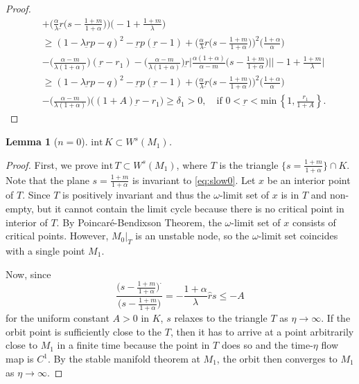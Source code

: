 \documentclass[a4paper,11pt]{article}
\newtheorem{lemma}{Lemma}[section]
\begin{document}
\begin{proof}
\begin{align}
  &+ \Big(\frac{\alpha}{\lambda}\underbar{r}\big(s- \frac{1+m}{1+\alpha}\big)\Big)\Big(-1+ \frac{1+m}{\lambda}\Big)\nonumber\\
  &\ge (1-\lambda \underbar{r}p -q)^2 -\underbar{r}p(\underbar{r}-1) + \Big(\frac{\alpha}{\lambda}\underbar{r}\big(s- \frac{1+m}{1+\alpha}\big)\Big)^2\Big(\frac{1+\alpha}{\alpha}\Big) \nonumber\\
  &- \Big(\frac{\alpha-m}{\lambda(1+\alpha)}\Big)(\underbar{r}-r_1) - \Big(\frac{\alpha-m}{\lambda(1+\alpha)}\Big)\underbar{r}\Big|\frac{\alpha(1+\alpha)}{\alpha-m}\big(s- \frac{1+m}{1+\alpha}\big)\Big|\Big|-1+ \frac{1+m}{\lambda}\Big|\nonumber\\
  &\ge (1-\lambda \underbar{r}p -q)^2  -\underbar{r}p(\underbar{r}-1) + \Big(\frac{\alpha}{\lambda}\underbar{r}\big(s- \frac{1+m}{1+\alpha}\big)\Big)^2\Big(\frac{1+\alpha}{\alpha}\Big) \nonumber\\
  &- \Big(\frac{\alpha-m}{\lambda(1+\alpha)}\Big)\Big((1+A)\underbar{r}-r_1\Big) \ge \delta_1>0, \quad \text{if $0<\underbar{r} < \textrm{min}\,\left\{1, \frac{r_1}{1+A}\right\}$.} \label{eq:affine}
 \end{align}
\end{proof}
\begin{lemma}[$n=0$] 
$\textrm{int}\, K \subset W^s(M_1)$.
\end{lemma}
\begin{proof}
 First, we prove $\textrm{int}\, T \subset W^s(M_1)$, where $T$ is the triangle $\{s=\frac{1+m}{1+\alpha}\} \cap K$. Note that the plane $s=\frac{1+m}{1+\alpha}$ is invariant to \eqref{eq:slow0}. Let $x$ be an interior point of $T$. Since $T$ is positively invariant and thus the $\omega$-limit set of $x$ is in $T$ and non-empty, but it cannot contain the limit cycle because there is no critical point in interior of $T$. By Poincar\'e-Bendixson Theorem, the $\omega$-limit set of $x$ consists of critical points. However, $M_0|_T$ is an unstable node, so the $\omega$-limit set coincides with a single point $M_1$.
 
 Now, since 
 $$\frac{\big(s- \frac{1+m}{1+\alpha}\big)^{\cdot}}{\big(s- \frac{1+m}{1+\alpha}\big)} = -\frac{1+\alpha}{\lambda}\hat{r}s\le -A$$
 for the uniform constant $A>0$ in $K$, $s$ relaxes to the triangle $T$ as $\eta \rightarrow \infty$. If the orbit point is sufficiently close to the $T$, then it has to arrive at a point arbitrarily close to $M_1$ in a finite time because the point in $T$ does so and the time-$\eta$ flow map is $C^1$. By the stable manifold theorem at $M_1$, the orbit then converges to $M_1$ as $\eta \rightarrow \infty$.
\end{proof}
\end{document}
